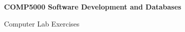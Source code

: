 

\thispagestyle{empty}


\begin{center}
{\Huge{\textbf{COMP5000 Software Development and Databases}}}

\vspace{1cm}

{\huge Computer Lab Exercises}

\vspace{2cm}

\vfill

\end{center}


